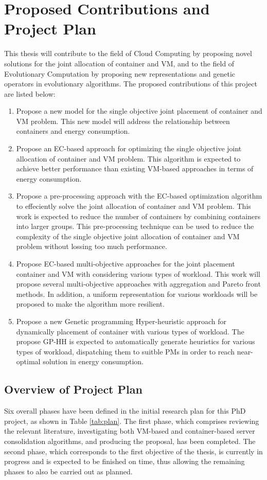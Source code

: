 \chapter{Proposed Contributions and Project Plan}\label{C:con}

This thesis will contribute to the field of Cloud Computing by proposing novel solutions for the joint allocation of container and VM, and to the field of Evolutionary Computation by proposing new representations and genetic operators in evolutionary algorithms. The proposed contributions of this project are listed below:
 
\begin{enumerate}
	\item Propose a new model for the single objective joint placement of container and VM problem. This new model will address the relationship between containers and energy consumption.
	\item Propose an EC-based approach for optimizing the single objective joint allocation of container and VM problem. This algorithm is expected to achieve better performance than existing VM-based approaches in terms of energy consumption. 
	\item Propose a pre-processing approach with the EC-based optimization algorithm to effeciently solve the joint allocation of container and VM problem. This work is expected to reduce the number of containers by combining containers into larger groups. This pre-processing technique can be used to reduce the complexity of the single objective joint allocation of container and VM problem without lossing too much performance. 
	\item Propose EC-based multi-objective approaches for the joint placement container and VM with considering various types of workload.
	This work will propose several multi-objective approaches with aggregation and Pareto front methods. In addition, a uniform representation for various workloads will be proposed to make the algorithm more resilient.
	\item Propose a new Genetic programming Hyper-heuristic approach for dynamically placement of container with various types of workload. The propose GP-HH is expected to automatically generate heuristics for various types of workload, dispatching them to suitble PMs in order to reach near-optimal solution in energy consumption.
\end{enumerate}

\section{Overview of Project Plan}
Six overall phases have been defined in the initial research plan for this PhD project, as
shown in Table \ref{tab:plan}. The first phase, which comprises reviewing the relevant literature, investigating both VM-based and container-based server consolidation algorithms, and producing the proposal, has
been completed. The second phase, which corresponds to the first objective of the thesis, is
currently in progress and is expected to be finished on time, thus allowing the remaining
phases to also be carried out as planned.

